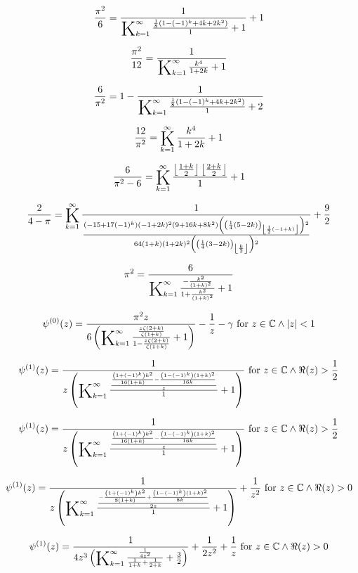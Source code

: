 \documentclass{article}
\newcommand{\bigK}{\mathop{\raisebox{-5pt}{\huge K}}}
\begin{document}
\[\frac{\pi ^2}{6}=\frac{1}{\bigK_{k=1}^{\infty}\frac{\frac{1}{8} \left(1-(-1)^k+4 k+2 k^2\right)}{1}+1}+1\] 

\[\frac{\pi ^2}{12}=\frac{1}{\bigK_{k=1}^{\infty}\frac{k^4}{1+2 k}+1}\] 

\[\frac{6}{\pi ^2}=1-\frac{1}{\bigK_{k=1}^{\infty}\frac{\frac{1}{8} \left(1-(-1)^k+4 k+2 k^2\right)}{1}+2}\] 

\[\frac{12}{\pi ^2}=\bigK_{k=1}^{\infty}\frac{k^4}{1+2 k}+1\] 

\[\frac{6}{\pi ^2-6}=\bigK_{k=1}^{\infty}\frac{\left\lfloor \frac{1+k}{2}\right\rfloor  \left\lfloor \frac{2+k}{2}\right\rfloor }{1}+1\] 

\[\frac{2}{4-\pi }=\bigK_{k=1}^{\infty}\frac{1}{\frac{\left(-15+17 (-1)^k\right) (-1+2 k)^2 \left(9+16 k+8 k^2\right) \left(\left(\frac{1}{4} (5-2 k)\right)_{\left\lfloor \frac{1}{2} (-1+k)\right\rfloor }\right){}^2}{64 (1+k) (1+2 k)^2 \left(\left(\frac{1}{4} (3-2 k)\right)_{\left\lfloor \frac{k}{2}\right\rfloor }\right){}^2}}+\frac{9}{2}\] 

\[\pi ^2=\frac{6}{\bigK_{k=1}^{\infty}\frac{-\frac{k^2}{(1+k)^2}}{1+\frac{k^2}{(1+k)^2}}+1}\] 

\[\psi ^{(0)}(z)=\frac{\pi ^2 z}{6 \left(\bigK_{k=1}^{\infty}\frac{\frac{z \zeta (2+k)}{\zeta (1+k)}}{1-\frac{z \zeta (2+k)}{\zeta (1+k)}}+1\right)}-\frac{1}{z}-\gamma \text{ for }z\in \mathbb{C}\land \left| z\right| <1\] 

\[\psi ^{(1)}(z)=\frac{1}{z \left(\bigK_{k=1}^{\infty}\frac{\frac{\frac{\left(1+(-1)^k\right) k^2}{16 (1+k)}-\frac{\left(1-(-1)^k\right) (1+k)^2}{16 k}}{z}}{1}+1\right)}\text{ for }z\in \mathbb{C}\land \Re(z)>\frac{1}{2}\] 

\[\psi ^{(1)}(z)=\frac{1}{z \left(\bigK_{k=1}^{\infty}\frac{\frac{\frac{\left(1+(-1)^k\right) k^2}{16 (1+k)}-\frac{\left(1-(-1)^k\right) (1+k)^2}{16 k}}{z}}{1}+1\right)}\text{ for }z\in \mathbb{C}\land \Re(z)>\frac{1}{2}\] 

\[\psi ^{(1)}(z)=\frac{1}{z \left(\bigK_{k=1}^{\infty}\frac{\frac{-\frac{\left(1+(-1)^k\right) k^2}{8 (1+k)}+\frac{\left(1-(-1)^k\right) (1+k)^2}{8 k}}{2 z}}{1}+1\right)}+\frac{1}{z^2}\text{ for }z\in \mathbb{C}\land \Re(z)>0\] 

\[\psi ^{(1)}(z)=\frac{1}{4 z^3 \left(\bigK_{k=1}^{\infty}\frac{\frac{1}{4 z^2}}{\frac{1}{1+k}+\frac{1}{2+k}}+\frac{3}{2}\right)}+\frac{1}{2 z^2}+\frac{1}{z}\text{ for }z\in \mathbb{C}\land \Re(z)>0\] 
\end{document}
